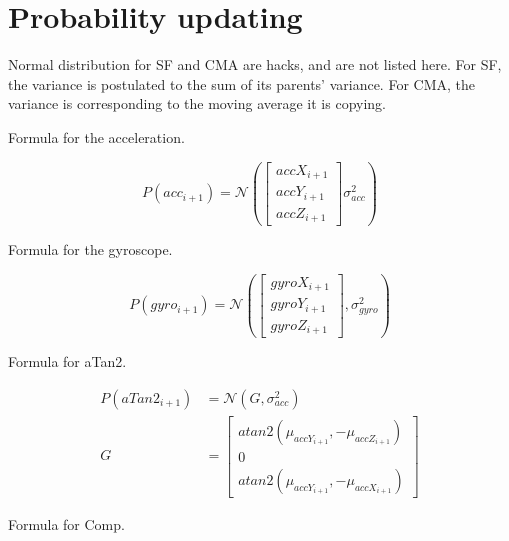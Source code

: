 \chapter{Probability updating}\label{app:direct-combination}
Normal distribution for SF and CMA are hacks, and are not listed here.
For SF, the variance is postulated to the sum of its parents' variance.
For CMA, the variance is corresponding to the moving average it is copying.

Formula for the acceleration.

\begin{equation}
	P(acc_{i+1})=\mathcal{N}(\begin{bmatrix}
	accX_{i+1} \\ accY_{i+1} \\ accZ_{i+1}
	\end{bmatrix}\sigma^2_{acc})
\end{equation}

Formula for the gyroscope.

\begin{equation}
	P(gyro_{i+1})=\mathcal{N}(\begin{bmatrix}
	gyroX_{i+1} \\ gyroY_{i+1} \\ gyroZ_{i+1}
	\end{bmatrix},\sigma^2_{gyro})
\end{equation}

Formula for aTan2.

\begin{equation}
\begin{aligned}
     P(aTan2_{i+1}) &= \mathcal{N}(G,\sigma^2_{acc})\\
     G &= \begin{bmatrix}
          atan2(\mu_{accY_{i+1}}, -\mu_{accZ_{i+1}})\\
          0\\
          atan2(\mu_{accY_{i+1}}, -\mu_{accX_{i+1}})
     \end{bmatrix}
\end{aligned}
\end{equation}

Formula for Comp.

